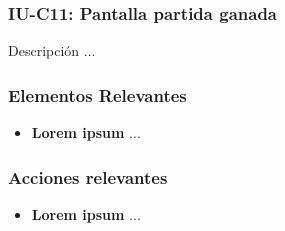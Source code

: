 
\subsubsection{IU-C11: Pantalla partida ganada}

 Descripción ...


\subsubsection{Elementos Relevantes}

    \begin{itemize}
    \item {\bf Lorem ipsum}
        ...
    \end{itemize}

\subsubsection{Acciones relevantes}

    \begin{itemize}
    \item {\bf Lorem ipsum}
        ...
    \end{itemize}

\clearpage
